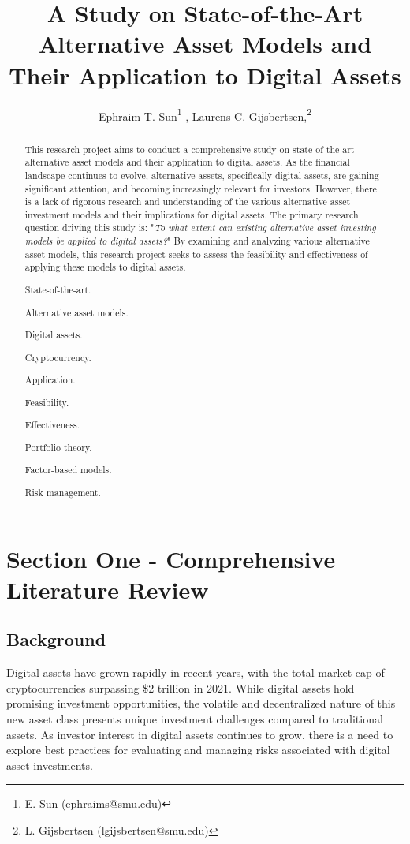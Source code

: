\documentclass{ledger}
\title{A Study on State-of-the-Art Alternative Asset Models and Their Application to Digital Assets
}
\author{Ephraim T. Sun\thanks{E. Sun (ephraims@smu.edu)} , Laurens C. Gijsbertsen,\thanks{L. Gijsbertsen (lgijsbertsen@smu.edu)}}
\begin{document}
\maketitle

\thispagestyle{pagefirst}

\begin{abstract}
This research project aims to conduct a comprehensive study on state-of-the-art alternative asset models and their application to digital assets. As the financial landscape continues to evolve, alternative assets, specifically digital assets, are gaining significant attention, and becoming increasingly relevant for investors. However, there is a lack of rigorous research and understanding of the various alternative asset investment models and their implications for digital assets. The primary research question driving this study is: "\textit{To what extent can existing alternative asset investing models be applied to digital assets?}" By examining and analyzing various alternative asset models, this research project seeks to assess the feasibility and effectiveness of applying these models to digital assets.

\begin{keywords}
\item State-of-the-art.
\item Alternative asset models.
\item Digital assets.
\item Cryptocurrency.
\item Application.
\item Feasibility.
\item Effectiveness.
\item Portfolio theory.
\item Factor-based models.
\item Risk management.
\end{keywords}
\end{abstract}

\section{Section One - Comprehensive Literature Review}
\subsection{Background}
Digital assets have grown rapidly in recent years, with the total market cap of cryptocurrencies surpassing \$2 trillion in 2021. While digital assets hold promising investment opportunities, the volatile and decentralized nature of this new asset class presents unique investment challenges compared to traditional assets. As investor interest in digital assets continues to grow, there is a need to explore best practices for evaluating and managing risks associated with digital asset investments.
\end{document}
